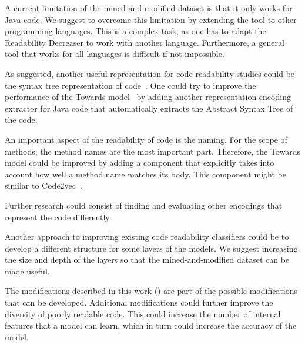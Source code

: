\documentclass[%
class=scrreprt,
chapterprefix=false,%
open=right,%
twoside=true,%
paper=a4,%
logofile={Logo\_zentral\_farbig\_EN.png},%
thesistype=master,%
UKenglish,%
]{se2thesis}
\theoremstyle{definition}
\newcommand{\RDH}{Readability Decreaser\xspace}
\begin{document}
	A current limitation of the mined-and-modified dataset is that it only works for Java code. We suggest to overcome this limitation by extending the tool to other programming languages. This is a complex task, as one has to adapt the \RDH to work with another language. Furthermore, a general tool that works for all languages is difficult if not impossible.
	
	
	As \citeauthor{mi2023graph} suggested, another useful representation for code readability studies could be the syntax tree representation of code~\cite{mi2023graph}. One could try to improve the performance of the Towards model~\cite{mi2022towards} by adding another representation encoding extractor for Java code that automatically extracts the Abstract Syntax Tree of the code.
	
	An important aspect of the readability of code is the naming. For the scope of methods, the method names are the most important part. Therefore, the Towards model could be improved by adding a component that explicitly takes into account how well a method name matches its body. This component might be similar to Code2vec~\cite{alon2019code2vec}.
	
	Further research could consist of finding and evaluating other encodings that represent the code differently.
	
	Another approach to improving existing code readability classifiers could be to develop a different structure for some layers of the models. We suggest increasing the size and depth of the layers so that the mined-and-modified dataset can be made useful.
	
	The modifications described in this work () are part of the possible modifications that can be developed. Additional modifications could further improve the diversity of poorly readable code. This could increase the number of internal features that a model can learn, which in turn could increase the accuracy of the model.
	
\end{document}
